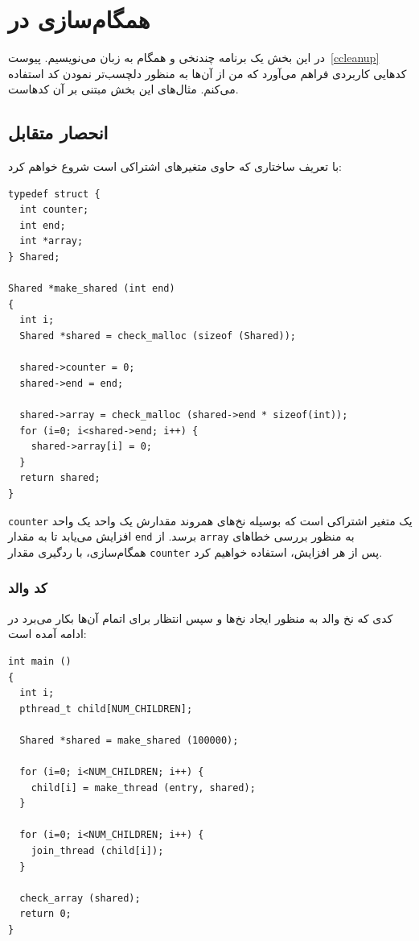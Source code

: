 \documentclass{book}
\begin{document}
\chapter{همگام‌سازی در }
\label{csync}

    در این بخش یک برنامه چندنخی و همگام به زبان  می‌نویسیم. پیوست~\ref{ccleanup} کدهایی کاربردی فراهم می‌آورد که 
    من از آن‌ها به منظور دلچسب‌تر نمودن کد   استفاده می‌کنم. مثال‌های این بخش مبتنی بر آن کدهاست. 
    
\section{انحصار متقابل}

    با تعریف ساختاری که حاوی متغیرهای اشتراکی است شروع خواهم کرد:

\begin{latin}
\begin{lstlisting}
typedef struct {
  int counter;
  int end;
  int *array;
} Shared;

Shared *make_shared (int end)
{
  int i;
  Shared *shared = check_malloc (sizeof (Shared));

  shared->counter = 0;
  shared->end = end;

  shared->array = check_malloc (shared->end * sizeof(int));
  for (i=0; i<shared->end; i++) {
    shared->array[i] = 0;
  }
  return shared;
}
\end{lstlisting}
\end{latin}

    {\tt counter} یک متغیر  اشتراکی است که بوسیله نخ‌های همروند مقدارش یک واحد یک واحد  افزایش می‌یابد تا به مقدار   {\tt end} برسد. 
    از {\tt array}  به منظور بررسی خطاهای همگام‌سازی، با ردگیری مقدار {\tt counter} پس از هر افزایش، استفاده خواهیم کرد.


\subsection{کد والد}

    کدی که نخ والد به منظور ایجاد نخ‌ها  و سپس انتظار برای اتمام آن‌ها بکار می‌برد در ادامه آمده‌ است:

\begin{latin}
\begin{lstlisting}
int main ()
{
  int i;
  pthread_t child[NUM_CHILDREN];

  Shared *shared = make_shared (100000);

  for (i=0; i<NUM_CHILDREN; i++) {
    child[i] = make_thread (entry, shared);
  }

  for (i=0; i<NUM_CHILDREN; i++) {
    join_thread (child[i]);
  }

  check_array (shared);
  return 0;
}
\end{lstlisting}
\end{latin}
\end{document}
